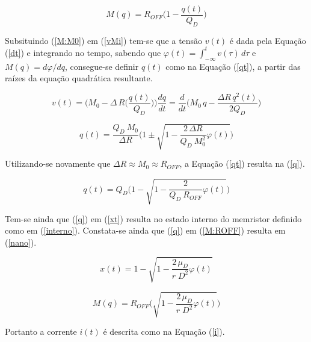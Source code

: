 \documentclass{ceel}
\begin{document}
\begin{multicols}{2}
\begin{equation}\label{M:ROFF}%
M(q)=R_{OFF}\bigg( 1-\dfrac{q(t)}{Q_D}\bigg)
\end{equation}
\vspace{0.05cm}

Subsituindo (\ref{M:M0}) em (\ref{vMi}) tem-se que a tensão $v(t)$ é dada pela Equação (\ref{dt}) e integrando no tempo, sabendo que $\varphi(t)=\int_{-\infty}^t v(\tau)\, d\tau$ e $M(q)=d\varphi/dq$,  consegue-se definir $q(t)$ como na Equação (\ref{qt}), a partir das raízes da equação quadrática resultante.

\begin{equation}\label{dt}
v(t)=\Big(M_0-\Delta \, R\Big(\dfrac{q(t)}{Q_D}\Big)\Big)\dfrac{dq}{dt} = \dfrac{d}{dt} \Big(M_0\, q-\dfrac{\Delta R\, q^2(t)}{2 Q_D}\Big)
\end{equation}

\begin{equation}\label{qt}
q(t)=\dfrac{Q_D\ M_0}{\Delta R}\Bigg(1\pm\sqrt{1-\dfrac{2\, \Delta R}{Q_D\ M^2_0}\varphi(t)}\Bigg)
\end{equation} 
\vspace{0.05cm}

Utilizando-se novamente que $\Delta R \approx M_0 \approx R_{OFF}$, a Equação (\ref{qt}) resulta na (\ref{q}). 
\vspace{0.05cm}

\begin{equation}\label{q}
q(t)=Q_D\Bigg(1-\sqrt{1-\dfrac{2}{Q_D\ R_{OFF}}\varphi(t)}\Bigg)
\end{equation} 
\vspace{0.05cm}

Tem-se ainda que (\ref{q}) em (\ref{xt}) resulta no estado interno do memristor definido como em (\ref{interno}). Constata-se ainda que (\ref{q}) em (\ref{M:ROFF}) resulta em (\ref{nano}).
\vspace{0.001cm}

\begin{equation}\label{interno}
x(t)=1-\sqrt{1-\dfrac{2\, \mu_D}{r\; D^2}\varphi(t)}
\end{equation} 

\begin{equation}\label{nano}
M(q)=R_{OFF}\Bigg(\sqrt{1-\dfrac{2\, \mu_D}{r\; D^2}\varphi(t) }\Bigg)
\end{equation}
\vspace{0.05cm}

Portanto a corrente $i(t)$ é descrita como na Equação (\ref{i}).


\end{multicols}
\end{document}
